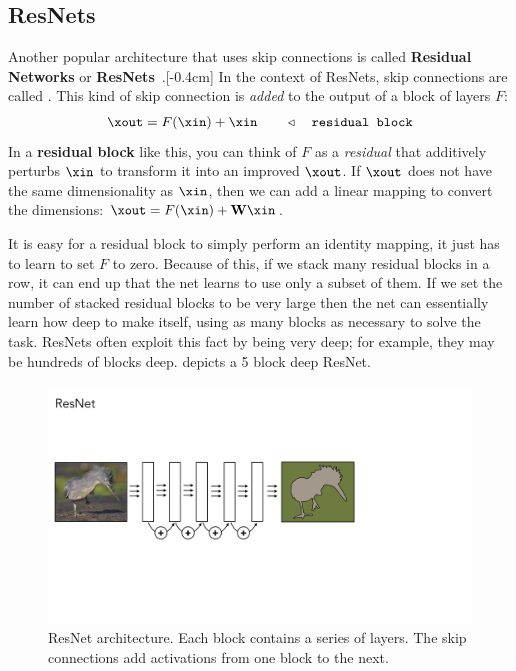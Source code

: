 \subsection{ResNets}
Another popular architecture that uses skip connections is called {\bf Residual Networks} or {\bf ResNets}~\cite{he2016deep}.[-0.4cm] 
In the context of ResNets, skip connections are called . This kind of skip connection is \textit{added} to the output of a block of layers $F$:
\begin{align}
    \xout = F(\xin) + \xin \quad\quad \triangleleft \quad \texttt{residual block}
\end{align}
In a {\bf residual block} like this, you can think of $F$ as a \textit{residual} that additively perturbs $\xin$ to transform it into an improved $\xout$. If $\xout$ does not have the same dimensionality as $\xin$, then we can add a linear mapping to convert the dimensions: $\xout = F(\xin) + \mathbf{W}\xin$.

It is easy for a residual block to simply perform an identity mapping, it just has to learn to set $F$ to zero. Because of this, if we stack many residual blocks in a row, it can end up that the net learns to use only a subset of them. If we set the number of stacked residual blocks to be very large then the net can essentially learn how deep to make itself, using as many blocks as necessary to solve the task. ResNets often exploit this fact by being very deep; for example, they may be hundreds of blocks deep. \Fig{\ref{fig:convolutional_neural_nets:resnet}} depicts a 5 block deep ResNet.
\begin{figure}[h]
    \centerline{
    \includegraphics[width=0.85\linewidth]{./figures/convolutional_neural_nets/resnet.pdf}
    }
    \caption{ResNet architecture. Each block contains a series of layers. The skip connections add activations from one block to the next.}
    \label{fig:convolutional_neural_nets:resnet}
\end{figure}


